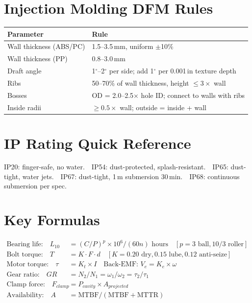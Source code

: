\documentclass[11pt,letterpaper,twoside,openany]{book}
\providecommand{\ang}[1]{#1\ensuremath{{}^{\circ}}}
\begin{document}
\section*{Injection Molding DFM Rules}
\begin{table}[htbp]\centering\small
\begin{tabularx}{\textwidth}{l X}
\toprule
\textbf{Parameter} & \textbf{Rule} \\
\midrule
Wall thickness (ABS/PC) & 1.5--3.5\,mm, uniform $\pm$10\% \\
Wall thickness (PP) & 0.8--3.0\,mm \\
Draft angle & \ang{1}--\ang{2} per side; add \ang{1} per 0.001\,in texture depth \\
Ribs & 50--70\% of wall thickness, height $\leq 3\times$ wall \\
Bosses & OD = 2.0--2.5$\times$ hole ID; connect to walls with ribs \\
Inside radii & $\geq 0.5\times$ wall; outside = inside + wall \\
\bottomrule
\end{tabularx}
\end{table}

\section*{IP Rating Quick Reference}
IP20: finger-safe, no water.\ \ IP54: dust-protected, splash-resistant.\ \ IP65: dust-tight, water jets.\ \ IP67: dust-tight, 1\,m submersion 30\,min.\ \ IP68: continuous submersion per spec.

\section*{Key Formulas}
\begin{align*}
\text{Bearing life:} \quad L_{10} &= (C/P)^p \times 10^6 / (60n) \text{ hours} \quad [p=3\text{ ball}, 10/3\text{ roller}] \\
\text{Bolt torque:} \quad T &= K \cdot F \cdot d \quad [K{=}0.20\text{ dry}, 0.15\text{ lube}, 0.12\text{ anti-seize}] \\
\text{Motor torque:} \quad \tau &= K_t \times I \quad \text{Back-EMF: } V_e = K_e \times \omega \\
\text{Gear ratio:} \quad GR &= N_2/N_1 = \omega_1/\omega_2 = \tau_2/\tau_1 \\
\text{Clamp force:} \quad F_{clamp} &= P_{cavity} \times A_{projected} \\
\text{Availability:} \quad A &= \text{MTBF} / (\text{MTBF} + \text{MTTR})
\end{align*}
\end{document}
